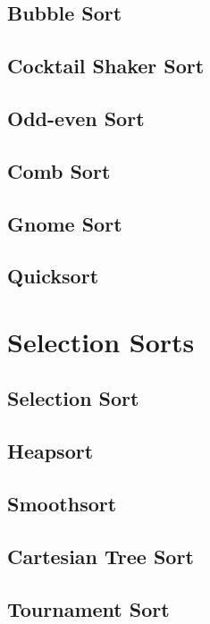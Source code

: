 			\subsection{Bubble Sort}

			\subsection{Cocktail Shaker Sort}

			\subsection{Odd-even Sort}

			\subsection{Comb Sort}

			\subsection{Gnome Sort}

			\subsection{Quicksort}

		\section{Selection Sorts}
			\subsection{Selection Sort}

			\subsection{Heapsort}

			\subsection{Smoothsort}

			\subsection{Cartesian Tree Sort}

			\subsection{Tournament Sort}

